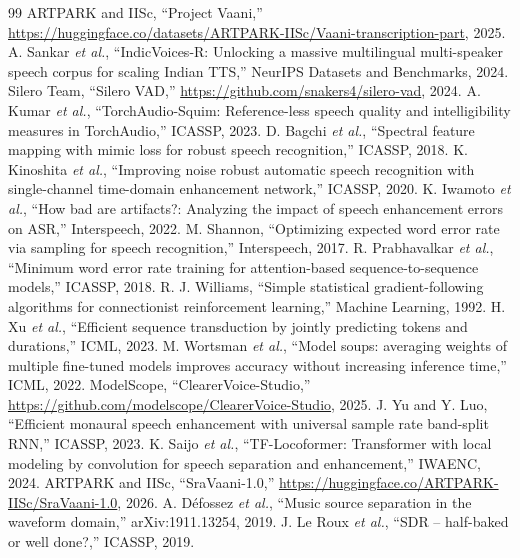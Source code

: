 \documentclass[conference]{IEEEtran}
\begin{document}
\def\IEEEbibitemsep{0pt plus .5pt}
\begin{thebibliography}{99}
\scriptsize
{} ARTPARK and IISc, ``Project Vaani,'' \url{https://huggingface.co/datasets/ARTPARK-IISc/Vaani-transcription-part}, 2025.
 A. Sankar \emph{et al.}, ``IndicVoices-R: Unlocking a massive multilingual multi-speaker speech corpus for scaling Indian TTS,'' NeurIPS Datasets and Benchmarks, 2024.
 Silero Team, ``Silero VAD,'' \url{https://github.com/snakers4/silero-vad}, 2024.
 A. Kumar \emph{et al.}, ``TorchAudio-Squim: Reference-less speech quality and intelligibility measures in TorchAudio,'' ICASSP, 2023.
 D. Bagchi \emph{et al.}, ``Spectral feature mapping with mimic loss for robust speech recognition,'' ICASSP, 2018.
 K. Kinoshita \emph{et al.}, ``Improving noise robust automatic speech recognition with single-channel time-domain enhancement network,'' ICASSP, 2020.
 K. Iwamoto \emph{et al.}, ``How bad are artifacts?: Analyzing the impact of speech enhancement errors on ASR,'' Interspeech, 2022.
 M. Shannon, ``Optimizing expected word error rate via sampling for speech recognition,'' Interspeech, 2017.
 R. Prabhavalkar \emph{et al.}, ``Minimum word error rate training for attention-based sequence-to-sequence models,'' ICASSP, 2018.
 R. J. Williams, ``Simple statistical gradient-following algorithms for connectionist reinforcement learning,'' Machine Learning, 1992.
 H. Xu \emph{et al.}, ``Efficient sequence transduction by jointly predicting tokens and durations,'' ICML, 2023.
 M. Wortsman \emph{et al.}, ``Model soups: averaging weights of multiple fine-tuned models improves accuracy without increasing inference time,'' ICML, 2022.
 ModelScope, ``ClearerVoice-Studio,'' \url{https://github.com/modelscope/ClearerVoice-Studio}, 2025.
 J. Yu and Y. Luo, ``Efficient monaural speech enhancement with universal sample rate band-split RNN,'' ICASSP, 2023.
 K. Saijo \emph{et al.}, ``TF-Locoformer: Transformer with local modeling by convolution for speech separation and enhancement,'' IWAENC, 2024.
 ARTPARK and IISc, ``SraVaani-1.0,'' \url{https://huggingface.co/ARTPARK-IISc/SraVaani-1.0}, 2026.
 A. D\'efossez \emph{et al.}, ``Music source separation in the waveform domain,'' arXiv:1911.13254, 2019.
 J. Le Roux \emph{et al.}, ``SDR -- half-baked or well done?,'' ICASSP, 2019.
\end{thebibliography}
\end{document}
